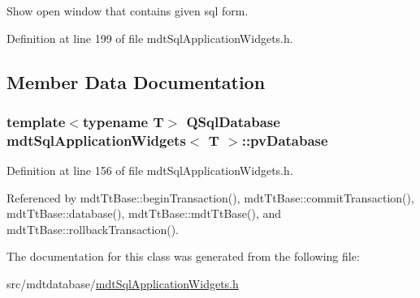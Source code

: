 Show open window that contains given sql form. 



Definition at line 199 of file mdt\-Sql\-Application\-Widgets.\-h.



\subsection{Member Data Documentation}
\hypertarget{classmdt_sql_application_widgets_ab837a76829e31f7d93d7cafce6d7d989}{
\subsubsection[{pv\-Database}]{\setlength{\rightskip}{0pt plus 5cm}template$<$typename T$>$ {\bf Q\-Sql\-Database} {\bf mdt\-Sql\-Application\-Widgets}$<$ T $>$\-::pv\-Database\hspace{0.3cm}{\ttfamily [protected]}}}\label{classmdt_sql_application_widgets_ab837a76829e31f7d93d7cafce6d7d989}


Definition at line 156 of file mdt\-Sql\-Application\-Widgets.\-h.



Referenced by mdt\-Tt\-Base\-::begin\-Transaction(), mdt\-Tt\-Base\-::commit\-Transaction(), mdt\-Tt\-Base\-::database(), mdt\-Tt\-Base\-::mdt\-Tt\-Base(), and mdt\-Tt\-Base\-::rollback\-Transaction().



The documentation for this class was generated from the following file\-:\begin{DoxyCompactItemize}
\item 
src/mdtdatabase/\hyperlink{mdt_sql_application_widgets_8h}{mdt\-Sql\-Application\-Widgets.\-h}\end{DoxyCompactItemize}
